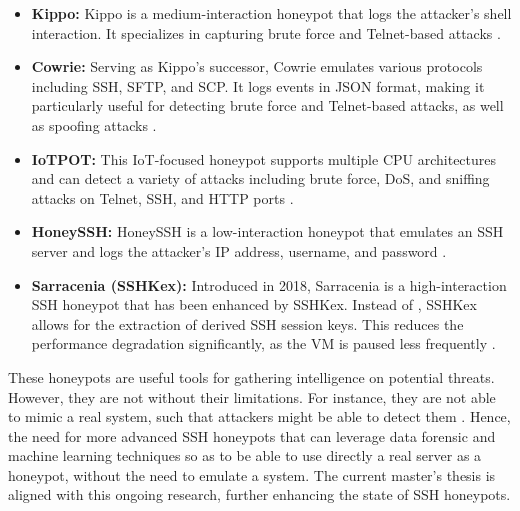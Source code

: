     \begin{itemize}
        \item \textbf{Kippo:} Kippo is a medium-interaction honeypot that logs the attacker's shell interaction. It specializes in capturing brute force and Telnet-based attacks \cite{ClassificationMalware21}.
        
        \item \textbf{Cowrie:} Serving as Kippo's successor, Cowrie emulates various protocols including SSH, SFTP, and SCP. It logs events in JSON format, making it particularly useful for detecting brute force and Telnet-based attacks, as well as spoofing attacks \cite{ClassificationMalware21}.
        
        \item \textbf{IoTPOT:} This IoT-focused honeypot supports multiple CPU architectures and can detect a variety of attacks including brute force, DoS, and sniffing attacks on Telnet, SSH, and HTTP ports \cite{ClassificationMalware21}.
        
        \item \textbf{HoneySSH:} HoneySSH is a low-interaction honeypot that emulates an SSH server and logs the attacker's IP address, username, and password \cite{honeyssh17}.
        
        \item \textbf{Sarracenia (SSHKex):} Introduced in 2018, Sarracenia is a high-interaction SSH honeypot that has been enhanced by SSHKex. Instead of  \cite{SSHkex22}, SSHKex allows for the extraction of derived SSH session keys. This reduces the performance degradation significantly, as the VM is paused less frequently \cite{SSHkex22} \cite{SarraceniaSSHHoneypot18}.
    \end{itemize}

    These honeypots are useful tools for gathering intelligence on potential threats. However, they are not without their limitations. For instance, they are not able to mimic a real system, such that attackers might be able to detect them  . Hence, the need for more advanced SSH honeypots that can leverage data forensic and machine learning techniques so as to be able to use directly a real server as a honeypot, without the need to emulate a system. The current master's thesis is aligned with this ongoing research, further enhancing the state of SSH honeypots.

